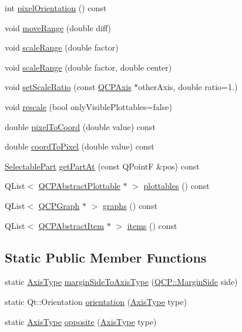 \begin{DoxyCompactItemize}
int \hyperlink{class_q_c_p_axis_a45c45bed7e5666683b8d56afa66fa51f}{pixel\+Orientation} () const
\item 
void \hyperlink{class_q_c_p_axis_a18f3a68f2b691af1fd34b6593c886630}{move\+Range} (double diff)
\item 
void \hyperlink{class_q_c_p_axis_a31d18ddf3a4f21ceb077db8ae5b69856}{scale\+Range} (double factor)
\item 
void \hyperlink{class_q_c_p_axis_a7072ff96fe690148f1bbcdb4f773ea1c}{scale\+Range} (double factor, double center)
\item 
void \hyperlink{class_q_c_p_axis_af4bbd446dcaee5a83ac30ce9bcd6e125}{set\+Scale\+Ratio} (const \hyperlink{class_q_c_p_axis}{Q\+C\+P\+Axis} $\ast$other\+Axis, double ratio=1.)
\item 
void \hyperlink{class_q_c_p_axis_a499345f02ebce4b23d8ccec96e58daa9}{rescale} (bool only\+Visible\+Plottables=false)
\item 
double \hyperlink{class_q_c_p_axis_a536ef8f624cac59b6b6fdcb495723c57}{pixel\+To\+Coord} (double value) const
\item 
double \hyperlink{class_q_c_p_axis_af15d1b3a7f7e9b53d759d3ccff1fe4b4}{coord\+To\+Pixel} (double value) const
\item 
\hyperlink{class_q_c_p_axis_abee4c7a54c468b1385dfce2c898b115f}{Selectable\+Part} \hyperlink{class_q_c_p_axis_a22ab2d71d7341b9b3974c0dd10619af2}{get\+Part\+At} (const Q\+PointF \&pos) const
\item 
Q\+List$<$ \hyperlink{class_q_c_p_abstract_plottable}{Q\+C\+P\+Abstract\+Plottable} $\ast$ $>$ \hyperlink{class_q_c_p_axis_ac5e0f6f65c75efb5fd32275d6e4ef0d6}{plottables} () const
\item 
Q\+List$<$ \hyperlink{class_q_c_p_graph}{Q\+C\+P\+Graph} $\ast$ $>$ \hyperlink{class_q_c_p_axis_ad590c0da223697a2727f97a520870fec}{graphs} () const
\item 
Q\+List$<$ \hyperlink{class_q_c_p_abstract_item}{Q\+C\+P\+Abstract\+Item} $\ast$ $>$ \hyperlink{class_q_c_p_axis_a42761bc68e2f3a9f68549d45b73f705b}{items} () const
\end{DoxyCompactItemize}
\subsection*{Static Public Member Functions}
\begin{DoxyCompactItemize}
\item 
static \hyperlink{class_q_c_p_axis_ae2bcc1728b382f10f064612b368bc18a}{Axis\+Type} \hyperlink{class_q_c_p_axis_ac0a6b77bd52bec6c81cd62d167cfeba6}{margin\+Side\+To\+Axis\+Type} (\hyperlink{namespace_q_c_p_a7e487e3e2ccb62ab7771065bab7cae54}{Q\+C\+P\+::\+Margin\+Side} side)
\item 
static Qt\+::\+Orientation \hyperlink{class_q_c_p_axis_a9a68b3e45f1b1e33d4d807822342516c}{orientation} (\hyperlink{class_q_c_p_axis_ae2bcc1728b382f10f064612b368bc18a}{Axis\+Type} type)
\item 
static \hyperlink{class_q_c_p_axis_ae2bcc1728b382f10f064612b368bc18a}{Axis\+Type} \hyperlink{class_q_c_p_axis_aa85ba73dfee6483e23825461b725e363}{opposite} (\hyperlink{class_q_c_p_axis_ae2bcc1728b382f10f064612b368bc18a}{Axis\+Type} type)
\end{DoxyCompactItemize}

